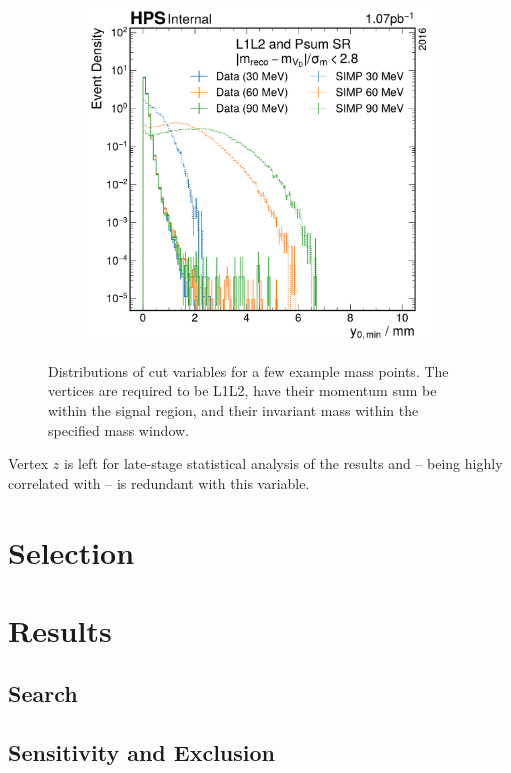 \begin{figure}
\begin{subfigure}{0.30\textwidth}
    \caption{\maxyzeroerr}
    \label{fig:data-signal-comp:max-y0-err}
  \end{subfigure}
  ~
  \begin{subfigure}{0.30\textwidth}
    \includegraphics[width=\textwidth]{figures/hps/analysis/min_y0-distribution.pdf}
    \caption{\minyzero}
    \label{fig:data-signal-comp:min-y0}
  \end{subfigure}
  \caption{%
    Distributions of cut variables for a few example mass points.
    The vertices are required to be L1L2, have their momentum sum be within
    the signal region, and their invariant mass within the specified mass window.
  }
  \label{fig:data-signal-comp}
\end{figure}

Vertex $z$ is left for late-stage statistical analysis of the results
and -- being highly correlated with \minyzero -- is redundant with this variable.

\section{Selection}

\section{Results}

\subsection{Search}

\subsection{Sensitivity and Exclusion}
